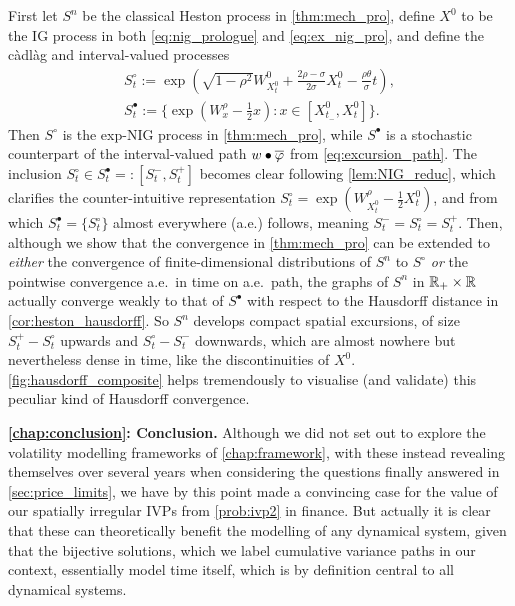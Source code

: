 First let $S^n$ be the classical Heston process in \autoref{thm:mech_pro}, define $X^0$ to be the IG process in both \autoref{eq:nig_prologue} and \autoref{eq:ex_nig_pro}, and define the c\`adl\`ag and interval-valued processes
\begin{multline}\label{eq:intro_limit_def}
    S^\circ_t := \exp\left(\sqrt{1-\rho^2}W^0_{X^0_t} + \frac{2\rho-\sigma}{2\sigma}X^0_t -\frac{\rho\theta}{\sigma} t\right), \\
    S^\bullet_t := \bigg\{\exp\left(W^\rho_x - \frac12 x\right) : x\in[X^0_{t_-},X^0_t] \bigg\}.
\end{multline}
Then $S^\circ$ is the exp-NIG process in \autoref{thm:mech_pro}, while $S^\bullet$ is a stochastic counterpart of the interval-valued path $w\bullet\overline{\varphi}$ from \autoref{eq:excursion_path}. The inclusion $S^\circ_t\in S^\bullet_t =:[S^-_t,S^+_t]$ becomes clear following \autoref{lem:NIG_reduc}, which clarifies the counter-intuitive representation $S^\circ_t=\exp(W^\rho_{X^0_t} - \frac12 X^0_t)$, and from which $S^\bullet_t=\{S^\circ_t\}$ almost everywhere (a.e.) follows, meaning $S^-_t=S^\circ_t=S^+_t$. Then, although we show that the convergence in \autoref{thm:mech_pro} can be extended to \emph{either} the convergence of finite-dimensional distributions of $S^n$ to $S^\circ$ \emph{or} the pointwise convergence a.e.~in time on a.e.~path, the graphs of $S^n$ in $\mathbb{R}_+\times\mathbb{R}$ actually converge weakly to that of $S^\bullet$ with respect to the Hausdorff distance in \autoref{cor:heston_hausdorff}. So $S^n$ develops compact spatial excursions, of size $S^+_t - S^\circ_t$ upwards and  $S^\circ_t - S^-_t$ downwards, which are almost nowhere but nevertheless dense in time, like the discontinuities of $X^0$. \autoref{fig:hausdorff_composite} helps tremendously to visualise (and validate) this peculiar kind of Hausdorff convergence.

\vspace{3mm}\textbf{\autoref{chap:conclusion}: Conclusion.} Although we did not set out to explore the volatility modelling frameworks of \autoref{chap:framework}, with these instead revealing themselves over several years when considering the questions finally answered in \autoref{sec:price_limits}, we have by this point made a convincing case for the value of our spatially irregular IVPs from \autoref{prob:ivp2} in finance. But actually it is clear that these can theoretically benefit the modelling of any dynamical system, given that the bijective solutions, which we label cumulative variance paths in our context, essentially model time itself, which is by definition central to all dynamical systems.

